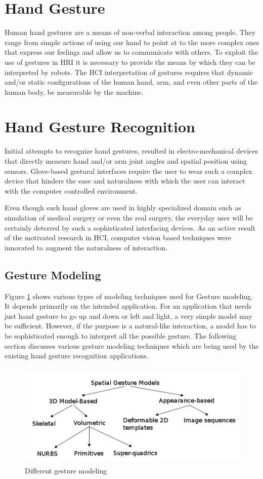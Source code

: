 \section{Hand Gesture} Human hand gestures are a means of non-verbal interaction among people. They range from simple actions of using our hand to point at to the more complex ones that express our feelings and allow us to communicate with others. To exploit the use of gestures in HRI it is necessary to provide the means by which they can be interpreted by robots. The HCI interpretation of gestures requires that dynamic and/or static configurations of the human hand, arm, and even other parts of the human body, be measurable by the machine. 

\section{Hand Gesture Recognition} Initial attempts to recognize hand gestures, resulted in electro-mechanical devices that directly measure hand and/or arm joint angles and spatial position using sensors. Glove-based gestural interfaces require the user to wear such a complex device that hinders the ease and naturalness with which the user can interact with the computer controlled environment. 

Even though such hand gloves are used in highly specialized domain such as simulation of medical surgery or even the real surgery, the everyday user will be certainly deterred by such a sophisticated interfacing devices. As an active result of the motivated research in HCI, computer vision based techniques were innovated to augment the naturalness of interaction.

\subsection{Gesture Modeling} Figure \ref{fig:ges:model} shows various types of modeling techniques used for Gesture modeling. It depends primarily on the intended application. For an application that needs just hand gesture to go up and down or left and light, a very simple model may be sufficient. However, if the purpose is a natural-like interaction, a model has to be sophisticated enough to interpret all the possible gesture. The following section discusses various gesture modeling techniques which are being used by the existing hand gesture recognition applications. 

\begin{figure}
	[h] \centering 
	\includegraphics[height=5cm]{figures/ges-model.png} 
	\caption{Different gesture modeling} 
	\label{fig:ges:model} 
\end{figure}

